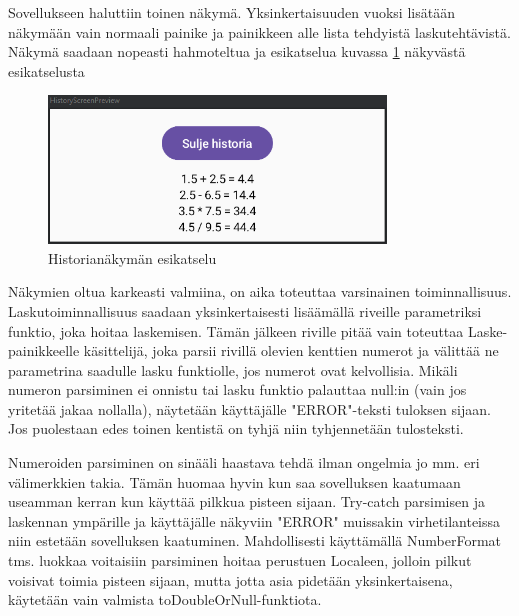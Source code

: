 Sovellukseen haluttiin toinen näkymä. Yksinkertaisuuden vuoksi lisätään näkymään
vain normaali painike ja painikkeen alle lista tehdyistä laskutehtävistä. Näkymä
saadaan nopeasti hahmoteltua ja esikatselua kuvassa
\ref{fig:exercise-5-history-preview} näkyvästä esikatselusta

\begin{figure}[h!]
    \centering
    \includegraphics[width=0.8\textwidth]{figures/exercise-5-history-preview.png}
    \caption{Historianäkymän esikatselu}
    \label{fig:exercise-5-history-preview}
\end{figure}

Näkymien oltua karkeasti valmiina, on aika toteuttaa varsinainen
toiminnallisuus. Laskutoiminnallisuus saadaan yksinkertaisesti lisäämällä
riveille parametriksi funktio, joka hoitaa laskemisen. Tämän jälkeen riville
pitää vain toteuttaa Laske-painikkeelle käsittelijä, joka parsii rivillä
olevien kenttien numerot ja välittää ne parametrina saadulle lasku funktiolle,
jos numerot ovat kelvollisia. Mikäli numeron parsiminen ei onnistu tai lasku
funktio palauttaa null:in (vain jos yritetää jakaa nollalla), näytetään
käyttäjälle "ERROR"-teksti tuloksen sijaan. Jos puolestaan edes toinen kentistä
on tyhjä niin tyhjennetään tulosteksti.

Numeroiden parsiminen on sinääli haastava tehdä ilman ongelmia jo mm. eri
välimerkkien takia. Tämän huomaa hyvin kun saa sovelluksen kaatumaan useamman
kerran kun käyttää pilkkua pisteen sijaan. Try-catch parsimisen ja laskennan
ympärille ja käyttäjälle näkyviin "ERROR" muissakin virhetilanteissa niin
estetään sovelluksen kaatuminen. Mahdollisesti käyttämällä NumberFormat tms.
luokkaa voitaisiin parsiminen hoitaa perustuen Localeen, jolloin pilkut
voisivat toimia pisteen sijaan, mutta jotta asia pidetään yksinkertaisena,
käytetään vain valmista toDoubleOrNull-funktiota.

